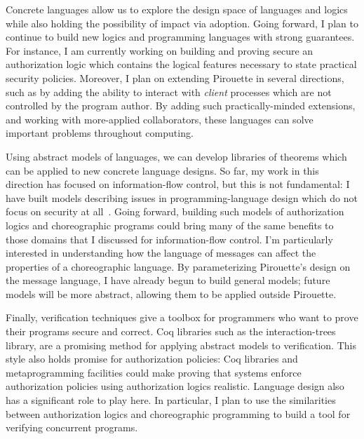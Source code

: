 \documentclass{article}
\theoremstyle{definition}
\begin{document}
Concrete languages allow us to explore the design space of languages and logics while also holding the possibility of impact via adoption.
Going forward, I plan to continue to build new logics and programming languages with strong guarantees.
For instance, I am currently working on building and proving secure an authorization logic which contains the logical features necessary to state practical security policies.
Moreover, I plan on extending Pirouette in several directions, such as by adding the ability to interact with \emph{client} processes which are not controlled by the program author.
By adding such practically-minded extensions, and working with more-applied collaborators, these languages can solve important problems throughout computing.

Using abstract models of languages, we can develop libraries of theorems which can be applied to new concrete language designs.
So far, my work in this direction has focused on information-flow control, but this is not fundamental: I have built models describing issues in programming-language design which do not focus on security at all~\citep{HirschT18}.
Going forward, building such models of authorization logics and choreographic programs could bring many of the same benefits to those domains that I discussed for information-flow control.
I'm particularly interested in understanding how the language of messages can affect the properties of a choreographic language.
By parameterizing Pirouette's design on the message language, I have already begun to build general models; future models will be more abstract, allowing them to be applied outside Pirouette.

Finally, verification techniques give a toolbox for programmers who want to prove their programs secure and correct.
Coq libraries such as the interaction-trees library, are a promising method for applying abstract models to verification.
This style also holds promise for authorization policies: Coq libraries and metaprogramming facilities could make proving that systems enforce authorization policies using authorization logics realistic.
Language design also has a significant role to play here.
In particular, I plan to use the similarities between authorization logics and choreographic programming to build a tool for verifying concurrent programs.


\end{document}
